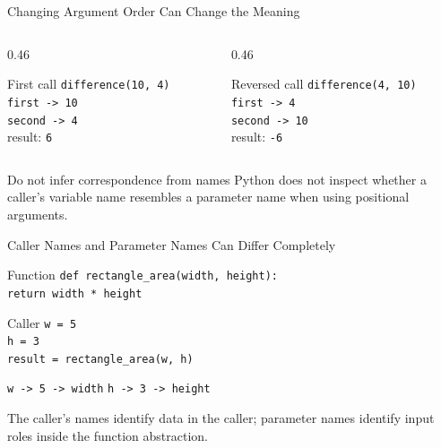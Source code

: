 \documentclass[aspectratio=169,10pt]{beamer}
\begin{document}
\begin{frame}{Changing Argument Order Can Change the Meaning}
  \begin{columns}[T,onlytextwidth]
    \begin{column}{0.46\textwidth}
      \begin{block}{First call}
        \texttt{difference(10, 4)}\\[0.08in]
        \texttt{first -> 10}\\
        \texttt{second -> 4}\\[0.08in]
        result: \texttt{6}
      \end{block}
    \end{column}

    \begin{column}{0.46\textwidth}
      \begin{block}{Reversed call}
        \texttt{difference(4, 10)}\\[0.08in]
        \texttt{first -> 4}\\
        \texttt{second -> 10}\\[0.08in]
        result: \texttt{-6}
      \end{block}
    \end{column}
  \end{columns}

  \begin{alertblock}{Do not infer correspondence from names}
    Python does not inspect whether a caller's variable name resembles a parameter name when using positional arguments.
  \end{alertblock}
\end{frame}

\begin{frame}{Caller Names and Parameter Names Can Differ Completely}
  \begin{block}{Function}
    \texttt{def rectangle\_area(width, height):}\\
    \hspace*{1em}\texttt{return width * height}
  \end{block}

  \begin{block}{Caller}
    \texttt{w = 5}\\
    \texttt{h = 3}\\
    \texttt{result = rectangle\_area(w, h)}
  \end{block}

  \begin{center}
    \texttt{w -> 5 -> width}
    \qquad
    \texttt{h -> 3 -> height}
  \end{center}

  \begin{keyidea}
    The caller's names identify data in the caller; parameter names identify input roles inside the function abstraction.
  \end{keyidea}
\end{frame}
\end{document}
